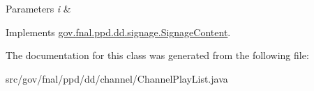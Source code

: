 \begin{DoxyParams}{Parameters}
{\em i} & \\
\hline
\end{DoxyParams}


Implements \hyperlink{interfacegov_1_1fnal_1_1ppd_1_1dd_1_1signage_1_1SignageContent_a59c75e24dcec3ea729297104328a7852}{gov.\-fnal.\-ppd.\-dd.\-signage.\-Signage\-Content}.



The documentation for this class was generated from the following file\-:\begin{DoxyCompactItemize}
\item 
src/gov/fnal/ppd/dd/channel/Channel\-Play\-List.\-java\end{DoxyCompactItemize}
